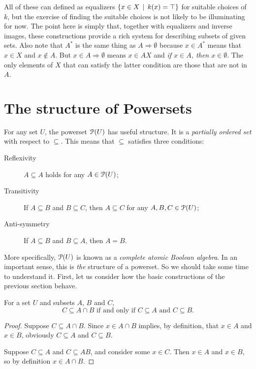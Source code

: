 All of these can defined as equalizers $\{x\in X\,\mid\, k(x)=\top\}$ for suitable choices of $k$, but the exercise of finding the suitable choices is not likely to be illuminating for now. 
The point here is simply that, together with equalizers and inverse images, these constructions provide a rich system for describing subsets of given sets.
Also note that $A^*$ is the same thing as $A\Rightarrow\emptyset$ because $x\in A^*$ means that $x\in X$ and $x\notin A$.
But $x\in A\Rightarrow \emptyset$ means $x\in AX$ and \emph{if $x\in A$, then $x\in\emptyset$}.
The only elements of $X$ that can satisfy the latter condition are those that are not in $A$.

\section{The structure of Powersets}
  
For any set $U$, the powerset ${\mathcal{P}}(U)$ has useful structure.
It is a \emph{partially ordered set} with respect to $\subseteq$.
This means that $\subseteq$ satisfies three conditions:
\begin{description}
	\item[Reflexivity] $A\subseteq A$ holds for any $A\in {\mathcal{P}}(U)$;
	\item[Transitivity] If $A\subseteq B$ and $B\subseteq C$, then $A\subseteq C$ for any $A,B,C\in{\mathcal{P}}(U)$;
	\item[Anti-symmetry] If $A\subseteq B$ and $B\subseteq A$, then $A=B$. 
\end{description}

More specifically, ${\mathcal{P}}(U)$ is known as a \emph{complete atomic Boolean algebra}. In an important sense, this is \emph{the} structure of a powerset. So we
should take some time to understand it. First, let us consider how the basic
constructions of the previous section behave.

\begin{lemma}
	For a set $U$ and subsets $A$, $B$ and $C$,
\[\text{$C\subseteq A\cap B$ if and only if $C\subseteq A$ and $C\subseteq B$.}\]
	
	\begin{proof}
		Suppose $C\subseteq A\cap B$.
		Since $x\in A\cap B$ implies, by definition,
		that $x\in A$ and $x\in B$, obviously $C\subseteq A$ and $C\subseteq B$.
		
		Suppose $C\subseteq A$ and $C\subseteq AB$, and consider some $x\in C$.
		Then $x\in A$ and $x\in B$, so by definition $x\in A\cap B$.
	\end{proof}
\end{lemma}

